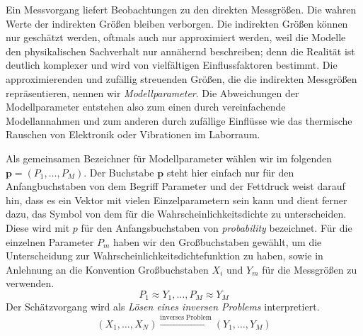Ein Messvorgang liefert Beobachtungen zu den direkten Messgrößen.
Die wahren Werte der indirekten Größen bleiben verborgen. Die
indirekten Größen können nur geschätzt werden, oftmals auch nur approximiert werden,
weil die Modelle den physikalischen Sachverhalt nur annähernd beschreiben;
denn die Realität ist deutlich komplexer und wird von vielfältigen Einflussfaktoren
bestimmt. Die approximierenden und zufällig streuenden Größen, die die indirekten Messgrößen
repräsentieren, nennen wir \textsl{Modellparameter}.
Die Abweichungen der Modellparameter entstehen also zum einen
durch vereinfachende Modellannahmen und zum anderen durch zufällige Einflüsse wie das
thermische Rauschen von Elektronik oder Vibrationen im Laborraum.

Als gemeinsamen Bezeichner für Modellparameter wählen wir im folgenden
$\mathbf{p} = (P_1, \dots, P_M)$.
Der Buchstabe $\mathbf{p}$ steht hier einfach nur für den Anfangbuchstaben
von dem Begriff Parameter und der Fettdruck weist darauf hin, dass es ein Vektor mit vielen
Einzelparametern sein kann und dient ferner dazu, das Symbol von dem für die Wahrscheinlichkeitsdichte
zu unterscheiden. Diese wird mit $p$ für den Anfangsbuchstaben von \textsl{probability} bezeichnet.
Für die einzelnen Parameter $P_m$ haben wir den Großbuchstaben gewählt, um die Unterscheidung zur
Wahrscheinlichkeitsdichtefunktion zu haben, sowie in Anlehnung an die Konvention Großbuchstaben
$X_i$ und $Y_m$ für die Messgrößen zu verwenden.
\begin{equation}
P_1 \approx Y_1, \dots, P_M \approx Y_M
\end{equation}
Der Schätzvorgang wird als \textsl{Lösen eines inversen Problems} interpretiert.
\begin{equation}
(X_1, \dots, X_N) \xrightarrow{\mathrm{inverses \; Problem}} (Y_1, \dots, Y_M)
\label{inverseProblem}
\end{equation}

